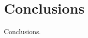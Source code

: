 \documentclass[sigplan,10pt,review,anonymous]{acmart}
\begin{document}












\section{Conclusions}

Conclusions.




\end{document}
